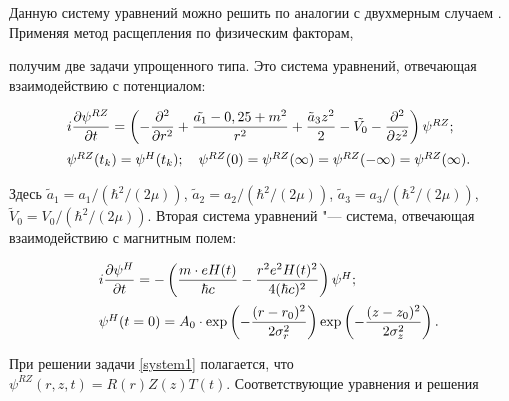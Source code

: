 \par

Данную систему уравнений можно решить по аналогии с двухмерным случаем \cite{Bryzgalov1}. Применяя метод расщепления по физическим факторам,

получим две задачи упрощенного типа. Это система уравнений, отвечающая взаимодействию с потенциалом:

\begin{equation}\label{system1}

    \begin{array}{@{\,}r@{\quad}l@{}}

    &i\dfrac{\partial\psi^{RZ}}{\partial{t}}=\left(-\dfrac{\partial^2}{\partial{r^2}}+\dfrac{\tilde{a_1}-0,25+m^2}{r^2}+\dfrac{\tilde{a}_3z^2}{2}-\tilde{V_0}-\dfrac{\partial^2}{\partial z^2}\right)\psi^{RZ}; \vspace{2mm} \\

    &\psi^{RZ}(t_k)=\psi^H(t_k); \quad \psi^{RZ}(0) = \psi^{RZ}(\infty)=\psi^{RZ}(-\infty)=\psi^{RZ}(\infty) .

    \end{array}

\end{equation}

Здесь $\tilde{a}_1 {=} a_1/(\hbar^2/(2\mu))$, $\tilde{a}_2 {=} a_2/(\hbar^2/(2\mu))$, $\tilde{a}_3 {=} a_3/(\hbar^2/(2\mu))$, $\tilde{V}_0 {=}

V_0/(\hbar^2/(2\mu))$. Вторая система уравнений "--- система, отвечающая взаимодействию с магнитным полем:

\begin{equation}\label{system2}

    \begin{array}{@{\,}r@{\quad}l@{}}

    &i\dfrac{\partial\psi^H}{\partial{t}}=-\left(\dfrac{m\cdot eH(t)}{\hbar c}-\dfrac{r^2e^2H(t)^2}{4(\hbar c)^2}\right)\psi^H; \vspace{2mm}\\

    &\psi^H(t=0) = A_0\cdot \exp\left(-\dfrac{(r-r_0)^2}{2\sigma_r^2}\right)\exp\left(-\dfrac{(z-z_0)^2}{2\sigma_z^2}\right) .

    \end{array}

\end{equation}



При решении задачи \eqref{system1} полагается, что $\psi^{RZ}(r,z,t)= R(r)Z(z)T(t).$ Соответствующие уравнения и решения


